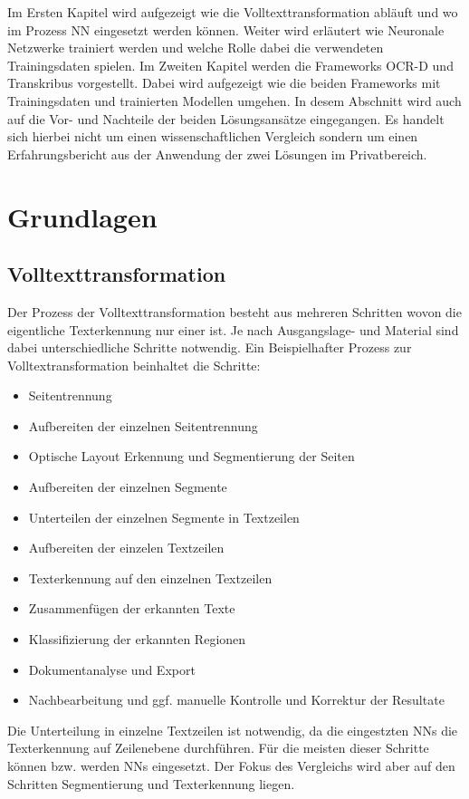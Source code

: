 \documentclass[a4paper,oneside, 12pt]{report}
\begin{document}
Im Ersten Kapitel wird aufgezeigt wie die Volltexttransformation abläuft und wo im Prozess \ac{NN} eingesetzt werden können. Weiter wird erläutert wie Neuronale Netzwerke trainiert werden und welche Rolle dabei die verwendeten Trainingsdaten spielen. Im Zweiten Kapitel werden die Frameworks OCR-D und Transkribus vorgestellt. Dabei wird aufgezeigt wie die beiden Frameworks mit Trainingsdaten und trainierten Modellen umgehen. In desem Abschnitt wird auch auf die Vor- und Nachteile der beiden Lösungsansätze eingegangen. Es handelt sich hierbei nicht um einen wissenschaftlichen Vergleich sondern um einen Erfahrungsbericht aus der Anwendung der zwei Lösungen im Privatbereich. 

\chapter{Grundlagen}\label{sec:grundlagen}
\section{Volltexttransformation}
Der Prozess der Volltexttransformation besteht aus mehreren Schritten wovon die eigentliche Texterkennung nur einer ist. Je nach Ausgangslage- und Material sind dabei unterschiedliche Schritte notwendig. Ein Beispielhafter Prozess zur Volltextransformation beinhaltet die Schritte:
\begin{itemize}\itemsep=0.5pt
  \item Seitentrennung
  \item Aufbereiten der einzelnen Seitentrennung
  \item Optische Layout Erkennung und Segmentierung der Seiten
  \item Aufbereiten der einzelnen Segmente
  \item Unterteilen der einzelnen Segmente in Textzeilen
  \item Aufbereiten der einzelen Textzeilen
  \item Texterkennung auf den einzelnen Textzeilen
  \item Zusammenfügen der erkannten Texte
  \item Klassifizierung der erkannten Regionen
  \item Dokumentanalyse und Export
  \item Nachbearbeitung und ggf. manuelle Kontrolle und Korrektur der Resultate
\end{itemize}
Die Unterteilung in einzelne Textzeilen ist notwendig, da die eingestzten \acp{NN} die Texterkennung auf Zeilenebene durchführen. Für die meisten dieser Schritte können bzw. werden \acp{NN} eingesetzt. Der Fokus des Vergleichs wird aber auf den Schritten Segmentierung und Texterkennung liegen.
\end{document}
